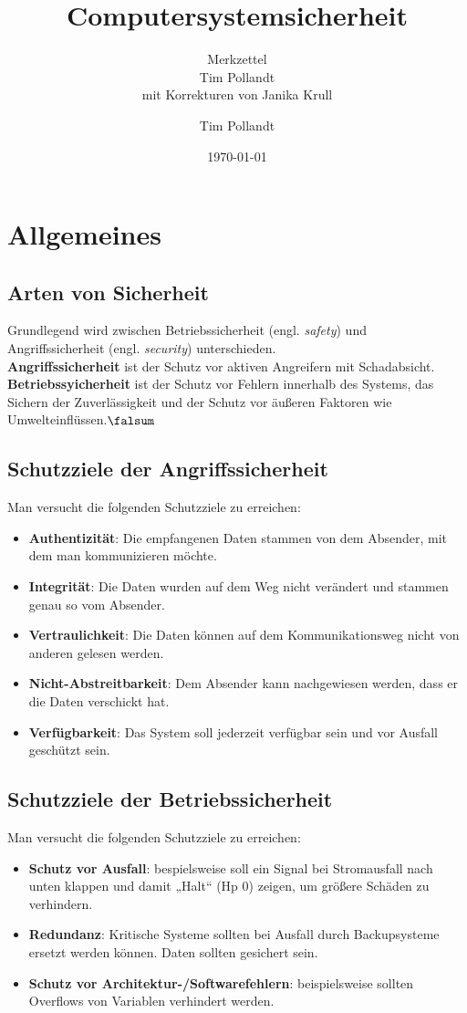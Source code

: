 \documentclass[a4paper, 11pt, accentcolor = tud3b]{tudreport}
\title{Computersystemsicherheit}
\subtitle{Merkzettel \\ Tim Pollandt\\\small{mit Korrekturen von Janika Krull}}
\author{Tim Pollandt}
\date{\today}
\begin{document}
    \maketitle
    \tableofcontents
    

	\chapter{Allgemeines}
			\section{Arten von Sicherheit}
				Grundlegend wird zwischen Betriebssicherheit (engl. \textit{safety}) und Angriffssicherheit (engl. \textit{security}) unterschieden.\\
				\textbf{Angriffssicherheit} ist der Schutz vor aktiven Angreifern mit Schadabsicht.\\
				\textbf{Betriebssyicherheit} ist der Schutz vor Fehlern innerhalb des Systems, das Sichern der Zuverlässigkeit und der Schutz vor äußeren Faktoren wie Umwelteinflüssen.$\falsum$
				
			\section{Schutzziele der Angriffssicherheit}
				Man versucht die folgenden Schutzziele zu erreichen:
				\begin{itemize}
					\item \textbf{Authentizität}: Die empfangenen Daten stammen von dem Absender, mit dem man kommunizieren möchte.
					\item \textbf{Integrität}: Die Daten wurden auf dem Weg nicht verändert und stammen genau so vom Absender.
					\item \textbf{Vertraulichkeit}: Die Daten können auf dem Kommunikationsweg nicht von anderen gelesen werden.
					\item \textbf{Nicht-Abstreitbarkeit}: Dem Absender kann nachgewiesen werden, dass er die Daten verschickt hat.
					\item \textbf{Verfügbarkeit}: Das System soll jederzeit verfügbar sein und vor Ausfall geschützt sein.
				\end{itemize}
				
			\section{Schutzziele der Betriebssicherheit}
				Man versucht die folgenden Schutzziele zu erreichen:
				\begin{itemize}
					\item \textbf{Schutz vor Ausfall}: bespielsweise soll ein Signal bei Stromausfall nach unten klappen und damit „Halt“ (Hp 0) zeigen, um größere Schäden zu verhindern.
					\item \textbf{Redundanz}: Kritische Systeme sollten bei Ausfall durch Backupsysteme ersetzt werden können. Daten sollten gesichert sein.
					\item \textbf{Schutz vor Architektur-/Softwarefehlern}: beispielsweise sollten Overflows von Variablen verhindert werden.
				\end{itemize}
				
\end{document}
